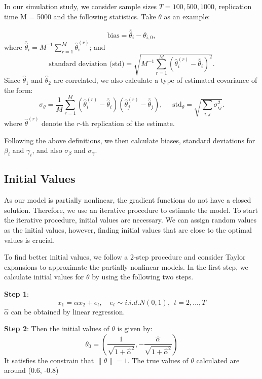 \documentclass[a4paper,12pt,times,numbered,print,index]{report}
\numberwithin{equation}{section}
\begin{document}
	In our simulation study, we consider sample sizes $T = 100, 500,  1000$, replication time M = 5000 and the following statistics. Take $\theta$ as an example:
	
	\[
	\text{bias}=\overline{\widehat{\theta}}_{i}-\theta _{i,0}, 
	\]%
	where $\overline{\widehat{\theta}}_{i}=M^{-1}\sum_{r=1}^{M}\widehat{\theta}_{i}^{(r)} $; and  
	\[
	\text{standard deviation (std)}=\sqrt{M^{-1}\sum_{r=1}^{M}\left( \widehat{\theta}_{i}^{(r)}-\overline{\widehat{\theta}}_{i}\right) ^{2}}. 
	\]%
	Since $\widehat{\theta}_1$ and $\widehat{\theta}_{2}$ are correlated, we also calculate a type of estimated covariance of the form:
	\begin{equation*}
		\label{std of theta}
		\sigma_{\theta}=\frac{1}{M} \sum_{r=1}^{M}\left(\widehat{\theta}_{i}^{(r)}-\overline{\widehat{\theta}}_{i}\right)\left(\widehat{\theta}_{j}^{(r)}-\overline{\widehat{\theta}}_{j}\right), \quad \text { std}_{\theta} = \sqrt{\sum_{i, j} \sigma_{i j}^{2}}.
	\end{equation*}
	where 
	$\widehat{\theta}^{(r)}$ denote the $r$-th replication of the estimate.
	
	Following the above definitions, we then calculate biases, standard deviations for $\beta_i$ and $\gamma_i$, and also $\sigma_{\beta}$ and $\sigma_{\gamma}$.
	
	\subsection{Initial Values}
	
	As our model is partially nonlinear, the gradient functions do not have a closed solution. Therefore, we use an iterative procedure to estimate the model. To start the iterative procedure, initial values are necessary. We can assign random values as the initial values, however, finding initial values that are close to the optimal values is crucial.
	
	To find better initial values, we follow a 2-step procedure and consider Taylor expansions to approximate the partially nonlinear models. In the first step, we calculate initial values for $\theta$ by using the following two steps.
	
	\textbf{Step 1}: 
	$$
	x_1 = \alpha x_2 + e_t, \quad e_{t}\sim i.i.d.N\left( 0,1\right) ,\ \ t=2,...,T
	$$
	$\hat{\alpha}$ can be obtained by linear regression. 
	
	\textbf{Step 2}: 
	Then the initial values of $\theta$ is given by:
	$$
	\theta_{0} = (\dfrac{1}{\sqrt{1+\hat{\alpha}^2}}, -\dfrac{\hat{\alpha}}{\sqrt{1+\hat{\alpha}^2}})
	$$
	It satisfies the constrain that $\|\theta\| = 1$. 
	The true values of $\theta$ calculated are around (0.6, -0.8)
	
\end{document}
